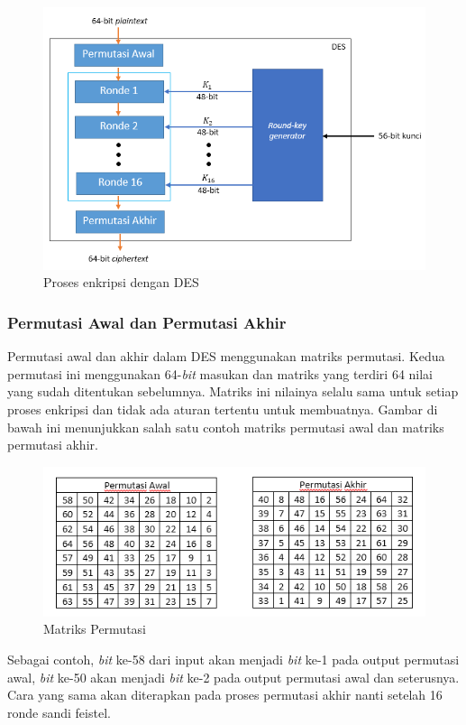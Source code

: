 \begin{figure}[h]
\includegraphics[scale=0.6]{Gambar/DES}%
\centering
\caption{Proses enkripsi dengan DES}
\end{figure}

\subsubsection{Permutasi Awal dan Permutasi Akhir}
Permutasi awal dan akhir dalam DES menggunakan matriks permutasi. Kedua permutasi ini menggunakan 64-\textit{bit} masukan dan matriks yang terdiri 64 nilai yang sudah ditentukan sebelumnya. Matriks ini nilainya selalu sama untuk setiap proses enkripsi dan tidak ada aturan tertentu untuk membuatnya. Gambar di bawah ini menunjukkan salah satu contoh matriks permutasi awal dan matriks permutasi akhir.

\begin{figure}[h]
\includegraphics[scale=0.8]{Gambar/permutasi}
\centering
\caption{Matriks Permutasi}
\end{figure}

Sebagai contoh, \textit{bit} ke-58 dari input akan menjadi \textit{bit} ke-1 pada output permutasi awal, \textit{bit} ke-50 akan menjadi \textit{bit} ke-2 pada output permutasi awal dan seterusnya. Cara yang sama akan diterapkan pada proses permutasi akhir nanti setelah 16 ronde sandi feistel.

